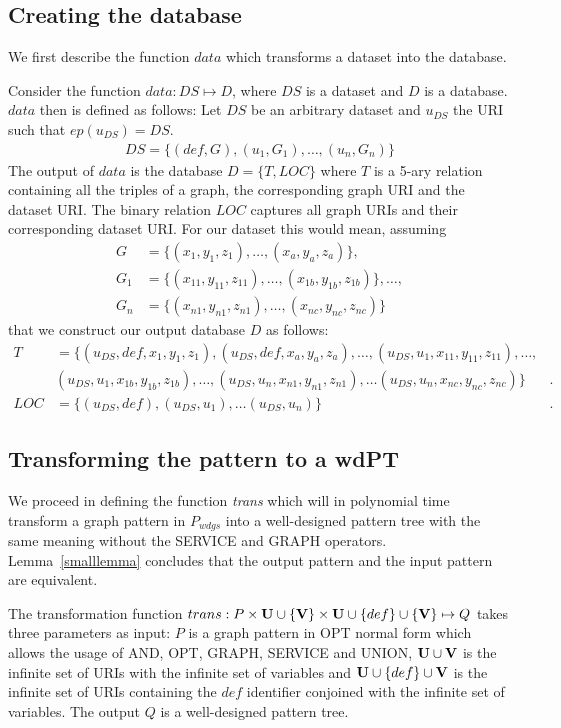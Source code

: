 \subsection{Creating the database}
We first describe the function $data$ which transforms a dataset into the
database.

Consider the function $data: DS \mapsto D$, where $DS$ is a
dataset and $D$ is a database.
$data$ then is defined as follows:
Let $DS$ be an arbitrary dataset and $u_{DS}$ the URI such that $ep(u_{DS}) = DS$.
\begin{align*}
	DS=\{(def,G),(u_1,G_1),\dots,(u_n,G_n)\}
\end{align*}
The output of $data$ is the database $D = \{ T,LOC\}$ where $T$ is a 5-ary relation containing all the triples of a graph, the corresponding graph URI and the dataset URI. The binary relation $LOC$
captures all graph URIs and their corresponding dataset URI. 
For our dataset this would mean, assuming 
\begin{align*}
	G &= \{(x_1,y_1,z_1), \dots, (x_a,y_a,z_a)\},\\ 
	G_1 &= \{(x_{11}, y_{11},z_{11}), \dots, (x_{1b},y_{1b},z_{1b}) \},\dots,\\ 
	G_n &= \{(x_{n1},y_{n1},z_{n1}),\dots,(x_{nc},y_{nc},z_{nc})\}
\end{align*} that we construct our output database $D$ as follows:
\begin{align*}
	T &= \{ (u_{DS},def,x_1,y_1,z_1), (u_{DS},def,x_a,y_a,z_a), \dots, (u_{DS},u_1,x_{11}, y_{11},z_{11}),
	\dots,\\& (u_{DS},u_1,x_{1b},y_{1b},z_{1b} ), \dots,
(u_{DS},u_n,x_{n1},y_{n1},z_{n1}), \dots (u_{DS},u_n,x_{nc},y_{nc},z_{nc})\}&. \\
	LOC &= \{ (u_{DS},def),(u_{DS},u_1),\dots (u_{DS},u_n) \}&.
\end{align*}

\subsection{Transforming the pattern to a wdPT}
We proceed in defining the function \textit{trans} which will in polynomial time 
transform a graph pattern in $P_{wdgs}$ into a well-designed pattern tree with the same meaning without the
SERVICE and GRAPH operators. Lemma~\ref{smalllemma} concludes that the output pattern and the
input pattern are equivalent.

\bigskip\noindent
The transformation function $trans: P \times \mathbf{U}\cup\{\mathbf{V}\} \times \mathbf{U} \cup \{def \}\cup\{\mathbf{V}\}
\mapsto Q$ takes  three parameters as input: 
$P$ is a graph pattern in OPT normal form which allows the usage of AND, OPT, GRAPH, SERVICE and
UNION, $\mathbf{U}\cup\mathbf{V}$ is the infinite
set of URIs with the infinite set of variables and $\mathbf{U}\cup\{def\}\cup \mathbf{V}$ is the infinite set of
URIs containing the $def$ identifier conjoined with the infinite set of
variables. The output $Q$ is a well-designed pattern tree. 

